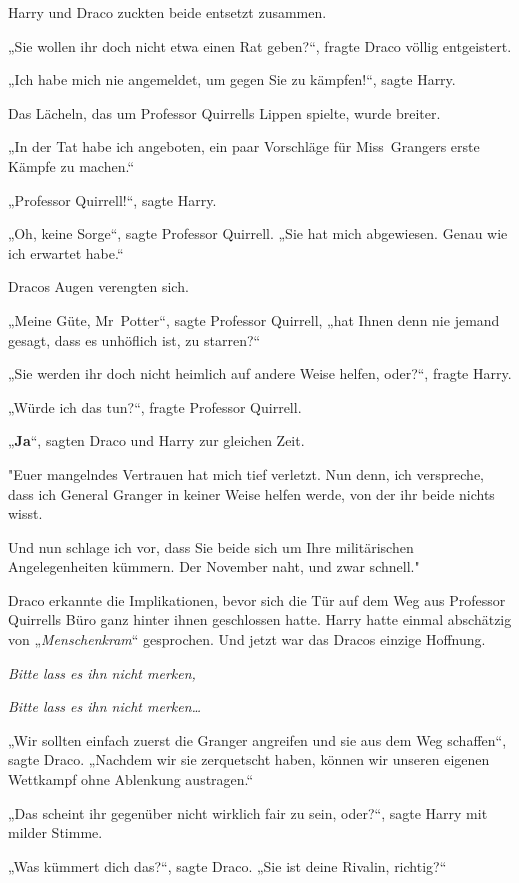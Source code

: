 {Harry und Draco zuckten beide entsetzt zusammen.

„Sie wollen ihr doch nicht etwa einen Rat geben?“, fragte Draco völlig entgeistert.

„Ich habe mich nie angemeldet, um gegen Sie zu kämpfen!“, sagte Harry.

Das Lächeln, das um Professor Quirrells Lippen spielte, wurde breiter.

„In der Tat habe ich angeboten, ein paar Vorschläge für Miss~Grangers erste Kämpfe zu machen.“

„Professor Quirrell!“, sagte Harry.

„Oh, keine Sorge“, sagte Professor Quirrell. „Sie hat mich abgewiesen. Genau wie ich erwartet habe.“

Dracos Augen verengten sich.

„Meine Güte, Mr~Potter“, sagte Professor Quirrell, „hat Ihnen denn nie jemand gesagt, dass es unhöflich ist, zu starren?“

„Sie werden ihr doch nicht heimlich auf andere Weise helfen, oder?“, fragte Harry.

„Würde ich das tun?“, fragte Professor Quirrell.

„\textbf{Ja}“, sagten Draco und Harry zur gleichen Zeit.

"Euer mangelndes Vertrauen hat mich tief verletzt. Nun denn, ich verspreche, dass ich General Granger in keiner Weise helfen werde, von der ihr beide nichts wisst.

Und nun schlage ich vor, dass Sie beide sich um Ihre militärischen Angelegenheiten kümmern. Der November naht, und zwar schnell."

Draco erkannte die Implikationen, bevor sich die Tür auf dem Weg aus Professor Quirrells Büro ganz hinter ihnen geschlossen hatte. Harry hatte einmal abschätzig von „\emph{Menschenkram}“ gesprochen. Und jetzt war das Dracos einzige Hoffnung.

\emph{Bitte lass es ihn nicht merken,}

\emph{Bitte lass es ihn nicht merken…}

„Wir sollten einfach zuerst die Granger angreifen und sie aus dem Weg schaffen“, sagte Draco. „Nachdem wir sie zerquetscht haben, können wir unseren eigenen Wettkampf ohne Ablenkung austragen.“

„Das scheint ihr gegenüber nicht wirklich fair zu sein, oder?“, sagte Harry mit milder Stimme.

„Was kümmert dich das?“, sagte Draco. „Sie ist deine Rivalin, richtig?“

}
